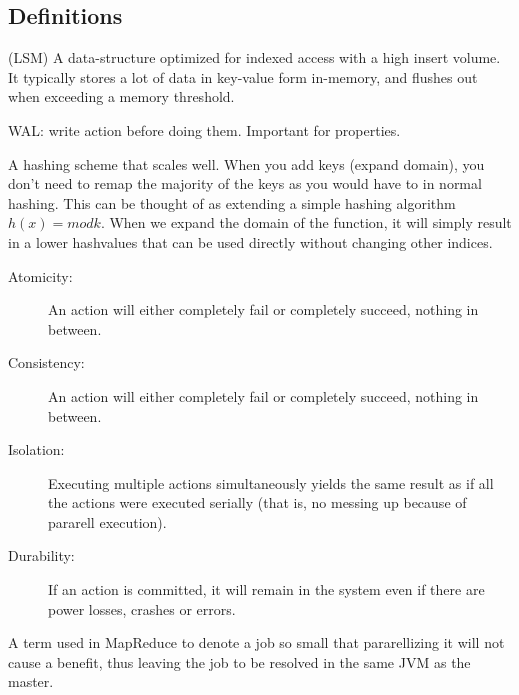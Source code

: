 \subsection{Definitions}

\begin{definition}\label{def:LSM}
    (LSM) A data-structure optimized for indexed access with a high insert volume.
    It typically stores a lot of data in key-value form in-memory, and flushes out
    when exceeding a memory threshold.
\end{definition}

\begin{definition}\label{def:WAL}
    WAL: write action before doing them. Important for  properties.
\end{definition}

\begin{definition}\label{def:consistenthashing}
    A hashing scheme that scales well. When you add keys (expand domain), you don't need to
    remap the majority of the keys as you would have to in normal hashing.
    This can be thought of as extending a simple hashing algorithm $h(x) = mod k$.
    When we expand the domain of the function, it will simply result in a lower hashvalues that can
    be used directly without changing other indices.
\end{definition}

\begin{definition}[ACID]\label{def:acid}
    \begin{description}
        \item[Atomicity:] An action will either completely fail or completely succeed, nothing  in between.
        \item[Consistency:] An action will either completely fail or completely succeed, nothing  in between.
        \item[Isolation:] Executing multiple actions simultaneously yields the same result as if all the actions
            were executed serially (that is, no messing up because of pararell execution).
        \item[Durability:] If an action is committed, it will remain in the system even if there are
            power losses, crashes or errors.
    \end{description}
\end{definition}

\begin{definition}\label{def:ubertask}
    A term used in MapReduce to denote a job so small that pararellizing it
    will not cause a benefit, thus leaving the job to be resolved in the same JVM 
    as the master.
\end{definition}

